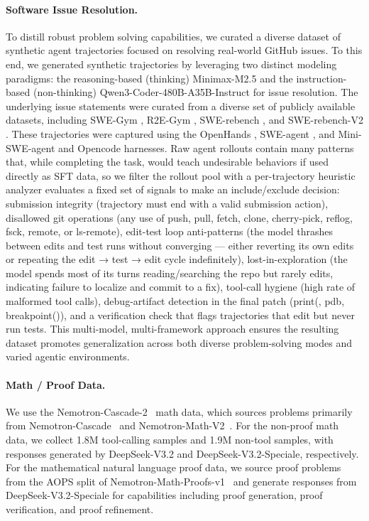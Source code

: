 \paragraph{Software Issue Resolution.}
To distill robust problem solving capabilities, we curated a diverse dataset of synthetic agent trajectories focused on resolving real-world GitHub issues. To this end, we generated synthetic trajectories by leveraging two distinct modeling paradigms: the reasoning-based (thinking) Minimax-M2.5 \citep{minimax2026m25} and the instruction-based (non-thinking) Qwen3-Coder-480B-A35B-Instruct \citep{yang2025qwen3technicalreport} for issue resolution. The underlying issue statements were curated from a diverse set of publicly available datasets, including SWE-Gym \citep{pan2025trainingsoftwareengineeringagents}, R2E-Gym \citep{jain2025r2egymproceduralenvironmentshybrid}, SWE-rebench \citep{badertdinov2025swerebenchautomatedpipelinetask}, and SWE-rebench-V2 \citep{badertdinov2026swe}. These trajectories were captured using the OpenHands \citep{wang2025openhandsopenplatformai}, SWE-agent \citep{yang2024sweagent}, and Mini-SWE-agent and Opencode harnesses. Raw agent rollouts contain many patterns that, while completing the task, would teach undesirable behaviors if used directly as SFT data, so we filter the rollout pool with a per-trajectory heuristic analyzer evaluates a fixed set of signals to make an include/exclude decision: submission
  integrity (trajectory must end with a valid submission action), disallowed git operations (any use of push, pull, fetch, clone, cherry-pick, reflog, fsck, remote, or ls-remote), edit-test loop anti-patterns (the model thrashes between edits and test runs without converging — either reverting its own edits or repeating the edit → test → edit cycle indefinitely), lost-in-exploration (the model spends most of its turns reading/searching the repo but rarely edits, indicating failure to localize and commit to a fix), tool-call hygiene (high rate of malformed tool calls), debug-artifact detection in the final patch (print(, pdb, breakpoint()), and a verification check that flags trajectories that edit but never run tests. This multi-model, multi-framework approach ensures the resulting dataset promotes generalization across both diverse problem-solving modes and varied agentic environments. 

\paragraph{Math / Proof Data.}
We use the Nemotron-Cascade-2~\citep{yang2026nemotron} math data, which sources problems primarily from Nemotron-Cascade~\citep{wang2025nemotroncascadescalingcascadedreinforcement,liu2025acereason} and Nemotron-Math-V2~\citep{du2025nemotronmath}.
For the non-proof math data, we collect 1.8M tool-calling samples and 1.9M non-tool samples, with responses generated by DeepSeek-V3.2 and DeepSeek-V3.2-Speciale, respectively.
For the mathematical natural language proof data, we source proof problems from the AOPS split of Nemotron-Math-Proofs-v1~\citep{du2025nemotronmath} and generate responses from DeepSeek-V3.2-Speciale for capabilities including proof generation, proof verification, and proof refinement.

